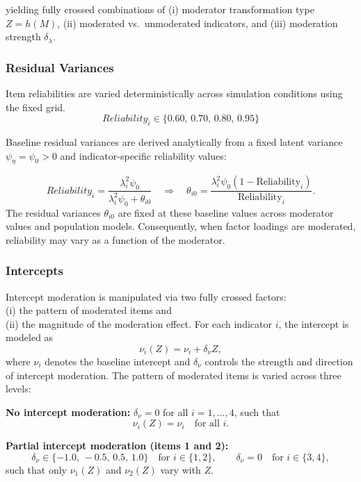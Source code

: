 \documentclass[
  man,
  floatsintext]{apa7}
\begin{document}
yielding fully crossed combinations of (i) moderator transformation type
\(Z=h(M)\), (ii) moderated vs.~unmoderated indicators, and (iii)
moderation strength \(\delta_{\lambda}\).

\subsubsection{Residual Variances}\label{residual-variances-1}

Item reliabilities are varied deterministically across simulation
conditions using the fixed grid. \[
Reliability_i \in \{0.60,\,0.70,\,0.80,\,0.95\}
\]

Baseline residual variances are derived analytically from a fixed latent
variance \(\psi_\eta=\psi_0>0\) and indicator-specific reliability
values:

\[
Reliability_i=\frac{\lambda_i^2 \psi_0}{\lambda_i^2 \psi_0 + \theta_{i0}}
\quad \Rightarrow \quad
\theta_{i0}=
\frac{\lambda_i^2 \psi_0(1-\text{Reliability}_i)}
{\text{Reliability}_i}.
\] The residual variances \(\theta_{i0}\) are fixed at these baseline
values across moderator values and population models. Consequently, when
factor loadings are moderated, reliability may vary as a function of the
moderator.

\subsubsection{Intercepts}\label{intercepts-1}

Intercept moderation is manipulated via two fully crossed factors:\\
(i) the pattern of moderated items and\\
(ii) the magnitude of the moderation effect. For each indicator \(i\),
the intercept is modeled as \[
\nu_i(Z) = \nu_i + \delta_{\nu} Z,
\] where \(\nu_i\) denotes the baseline intercept and \(\delta_{\nu}\)
controls the strength and direction of intercept moderation. The pattern
of moderated items is varied across three levels:

\textbf{No intercept moderation:} \(\delta_{\nu} = 0\) for all
\(i = 1,\dots,4\), such that \[
  \nu_i(Z) = \nu_i \quad \text{for all } i.
  \]

\textbf{Partial intercept moderation (items 1 and 2):}\\
\[
    \delta_{\nu} \in \{-1.0,\,-0.5,\,0.5,\,1.0\} \quad \text{for } i \in \{1,2\},
    \qquad
    \delta_{\nu} = 0 \quad \text{for } i \in \{3,4\},
    \] such that only \(\nu_1(Z)\) and \(\nu_2(Z)\) vary with \(Z\).
\end{document}
